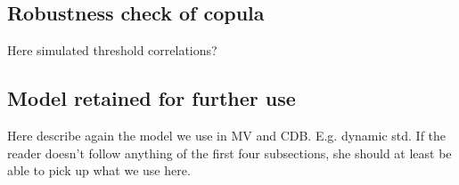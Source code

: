 \subsection{Robustness check of copula}
Here simulated threshold correlations?
\subsection{Model retained for further use}
Here describe again the model we use in MV and CDB. E.g. dynamic std. If the reader doesn't follow anything of the first four subsections, she should at least be able to pick up what we use here.
%





